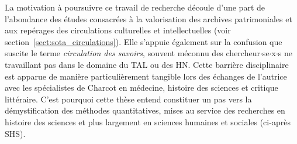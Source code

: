 La motivation à poursuivre ce travail de recherche découle d’une part de l'abondance des études consacrées à la valorisation des archives patrimoniales et aux repérages des circulations culturelles et intellectuelles (voir section~\ref{sect:sota_circulations}). Elle s'appuie également sur la confusion que suscite le terme \textit{circulation des savoirs}, souvent méconnu des chercheur$\cdot$se$\cdot$x$\cdot$s ne travaillant pas dans le domaine du \textsc{TAL} ou des \textsc{HN}.
Cette barrière disciplinaire est apparue de manière particulièrement tangible lors des échanges de l’autrice avec les spécialistes de Charcot en médecine, histoire des sciences et critique littéraire. C'est pourquoi cette thèse entend constituer un pas vers la démystification des méthodes quantitatives, mises au service des recherches en histoire des sciences et plus largement en sciences humaines et sociales (ci-après \og{}\textsc{SHS}\fg{}).

